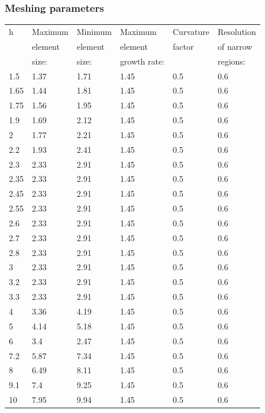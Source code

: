 \subsubsection{Meshing parameters}
\begin{tabular}{ | l | l | l | l | l | l | }
\hline
	h & Maximum & Minimum & Maximum   & Curvature  & Resolution \\ 
	 &  element &  element &  element   &  factor & of narrow  \\
	 &   size: &   size: &  growth rate: &   &  regions: \\ \hline
	1.5 & 1.37 & 1.71 & 1.45 & 0.5 & 0.6 \\ \hline
	1.65 & 1.44 & 1.81 & 1.45 & 0.5 & 0.6 \\ \hline
	1.75 & 1.56 & 1.95 & 1.45 & 0.5 & 0.6 \\ \hline
	1.9 & 1.69 & 2.12 & 1.45 & 0.5 & 0.6 \\ \hline
	2 & 1.77 & 2.21 & 1.45 & 0.5 & 0.6 \\ \hline
	2.2 & 1.93 & 2.41 & 1.45 & 0.5 & 0.6 \\ \hline
	2.3 & 2.33 & 2.91 & 1.45 & 0.5 & 0.6 \\ \hline
	2.35 & 2.33 & 2.91 & 1.45 & 0.5 & 0.6 \\ \hline
	2.45 & 2.33 & 2.91 & 1.45 & 0.5 & 0.6 \\ \hline
	2.55 & 2.33 & 2.91 & 1.45 & 0.5 & 0.6 \\ \hline
	2.6 & 2.33 & 2.91 & 1.45 & 0.5 & 0.6 \\ \hline
	2.7 & 2.33 & 2.91 & 1.45 & 0.5 & 0.6 \\ \hline
	2.8 & 2.33 & 2.91 & 1.45 & 0.5 & 0.6 \\ \hline
	3 & 2.33 & 2.91 & 1.45 & 0.5 & 0.6 \\ \hline
	3.2 & 2.33 & 2.91 & 1.45 & 0.5 & 0.6 \\ \hline
	3.3 & 2.33 & 2.91 & 1.45 & 0.5 & 0.6 \\ \hline
	4 & 3.36 & 4.19 & 1.45 & 0.5 & 0.6 \\ \hline
	5 & 4.14 & 5.18 & 1.45 & 0.5 & 0.6 \\ \hline
	6 & 3.4 & 2.47 & 1.45 & 0.5 & 0.6 \\ \hline
	7.2 & 5.87 & 7.34 & 1.45 & 0.5 & 0.6 \\ \hline
	8 & 6.49 & 8.11 & 1.45 & 0.5 & 0.6 \\ \hline
	9.1 & 7.4 & 9.25 & 1.45 & 0.5 & 0.6 \\ \hline
	10 & 7.95 & 9.94 & 1.45 & 0.5 & 0.6 \\ \hline
\end{tabular}


